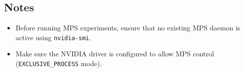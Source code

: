 \documentclass[sigconf,nonacm]{acmart}
\begin{document}
\subsection{Notes}
\begin{itemize}
    \item Before running MPS experiments, ensure that no existing MPS daemon is active using \texttt{nvidia-smi}.
    \item Make sure the NVIDIA driver is configured to allow MPS control (\texttt{EXCLUSIVE\_PROCESS} mode).
\end{itemize}





\end{document}
